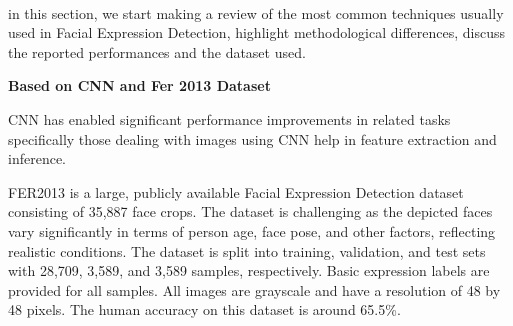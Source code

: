 
\paragraph{}
\large in this section, we start making a review of the most common techniques usually used in Facial Expression Detection, highlight methodological differences, discuss the reported performances and the dataset used. \newline

\textbf{Based on CNN and Fer 2013 Dataset}\newline

\large CNN has enabled significant performance improvements in related tasks specifically those dealing with images using CNN help in feature extraction and inference. 

\large FER2013 is a large, publicly available Facial Expression Detection dataset consisting of 35,887 face crops. The dataset is challenging as the depicted faces vary significantly in terms of person age, face pose, and other factors, reflecting realistic conditions. The dataset is split into training, validation, and test sets with 28,709, 3,589, and 3,589 samples, respectively. Basic expression labels are provided for all samples. All images are grayscale and have a resolution of 48 by 48 pixels. The human accuracy on this dataset is around 65.5\%.
  
